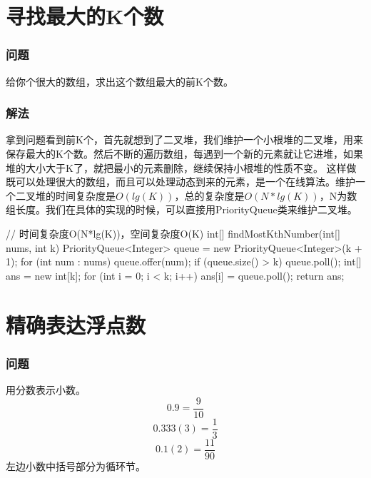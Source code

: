 \section{寻找最大的K个数} %
\label{sec:find-k-great-number}

\subsubsection{问题}
给你个很大的数组，求出这个数组最大的前K个数。

\subsubsection{解法}
拿到问题看到前K个，首先就想到了二叉堆，我们维护一个小根堆的二叉堆，用来保存最大的K个数。然后不断的遍历数组，每遇到一个新的元素就让它进堆，如果堆的大小大于K了，就把最小的元素删除，继续保持小根堆的性质不变。
这样做既可以处理很大的数组，而且可以处理动态到来的元素，是一个在线算法。维护一个二叉堆的时间复杂度是$O(lg(K))$，总的复杂度是$O(N*lg(K))$，N为数组长度。我们在具体的实现的时候，可以直接用PriorityQueue类来维护二叉堆。
\begin{Code}
// 时间复杂度O(N*lg(K))，空间复杂度O(K)
int[] findMostKthNumber(int[] nums, int k) {
    PriorityQueue<Integer> queue = new PriorityQueue<Integer>(k + 1);
    for (int num : nums) {
        queue.offer(num);
        if (queue.size() > k) {
            queue.poll();
        }
    }
    int[] ans = new int[k];
    for (int i = 0; i < k; i++) {
        ans[i] = queue.poll();
    }
    return ans;
}
\end{Code}


\section{精确表达浮点数} %
\label{sec:float-number}

\subsubsection{问题}
用分数表示小数。
\[ 0.9 = \frac{9}{10} \]
\[ 0.333(3) = \frac{1}{3} \]
\[ 0.1(2) = \frac{11}{90} \]
左边小数中括号部分为循环节。

